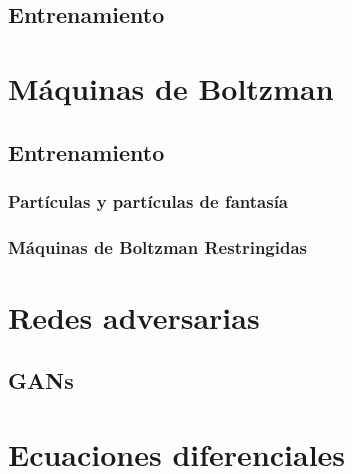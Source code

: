 \documentclass[12pt,openany]{book}
\begin{document}
\section{Entrenamiento}

\chapter{Máquinas de Boltzman}
\section{Entrenamiento}
\subsection{Partículas y partículas de fantasía}
\subsection{Máquinas de Boltzman Restringidas}

\chapter{Redes adversarias}
\section{GANs}

\appendix 
\chapter{Ecuaciones diferenciales}

\backmatter

\printbibliography[heading=bibintoc]
\end{document}
